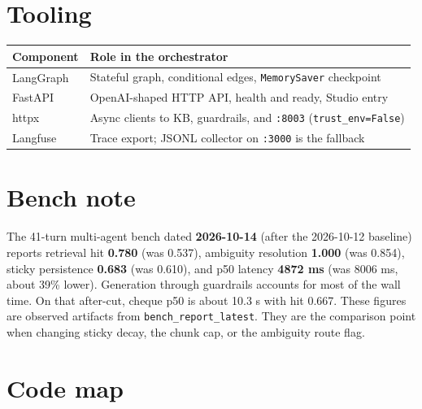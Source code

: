 \section{Tooling}\label{tooling}

\begin{longtable}[]{@{}
  >{\raggedright\arraybackslash}p{}
  >{\raggedright\arraybackslash}p{}@{}}
\toprule\noalign{}
Component & Role in the orchestrator \\
\midrule\noalign{}
\endhead
\bottomrule\noalign{}
\endlastfoot
LangGraph & Stateful graph, conditional edges, \texttt{MemorySaver} checkpoint \\
FastAPI & OpenAI-shaped HTTP API, health and ready, Studio entry \\
httpx & Async clients to KB, guardrails, and \texttt{:8003} (\texttt{trust\_env=False}) \\
Langfuse & Trace export; JSONL collector on \texttt{:3000} is the fallback \\
\end{longtable}

\section{Bench note}\label{bench-note}

The 41-turn multi-agent bench dated \textbf{2026-10-14} (after the 2026-10-12 baseline) reports retrieval hit \textbf{0.780} (was 0.537), ambiguity resolution \textbf{1.000} (was 0.854), sticky persistence \textbf{0.683} (was 0.610), and p50 latency \textbf{4872 ms} (was 8006 ms, about 39\% lower). Generation through guardrails accounts for most of the wall time. On that after-cut, cheque p50 is about 10.3 s with hit 0.667. These figures are observed artifacts from \texttt{bench\_report\_latest}. They are the comparison point when changing sticky decay, the chunk cap, or the ambiguity route flag.

\section{Code map}\label{code-map}


